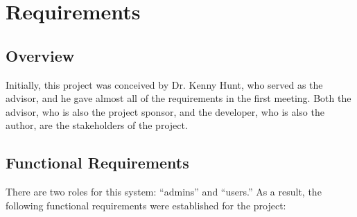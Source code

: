 \section{Requirements}
\label{sec:Requirements}

\subsection{Overview}
\label{sec:Requirements>Overview}
Initially, this project was conceived by Dr. Kenny Hunt, who served as the advisor, and he gave almost all of the requirements \cite{web:Metropolist} in the first meeting. Both the advisor, who is also the project sponsor, and the developer, who is also the author, are the stakeholders of the project.

\subsection{Functional Requirements}
\label{sec:Requirements>Functional Requirements}
There are two roles for this system: ``admins'' and ``users.'' As a result, the following functional requirements were established for the project:
